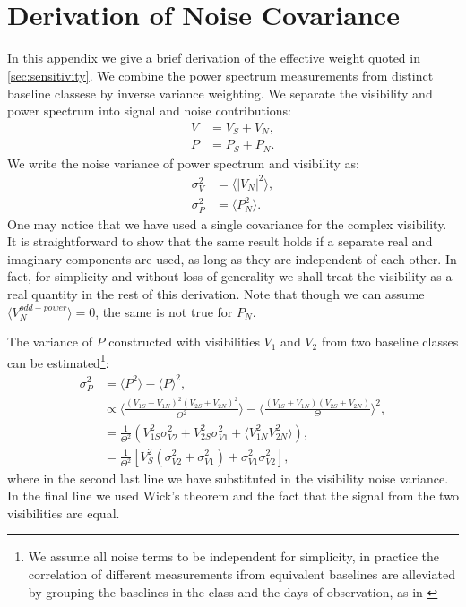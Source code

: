 \documentclass[twocolumn,apj,numberedappendix]{emulateapj}
\renewcommand\[{\begin{equation}}
\renewcommand\]{\end{equation}}
\begin{document}
\section{\label{sec:appB}\\Derivation of Noise Covariance \label{sec:appB}}
\label{sec:appB}
In this appendix we give a brief derivation of the effective weight quoted in \ref{sec:sensitivity}. We combine the power spectrum measurements from distinct baseline classese by inverse variance weighting. We separate the visibility and power spectrum into signal and noise contributions:
\begin{equation}
\begin{aligned}
V &= V_S+V_N,\\
P &= P_S+P_N.
\end{aligned}
\end{equation}
We write the noise variance of power spectrum and visibility as:
\begin{equation}
\begin{aligned}
\sigma_V^2 &= \langle |V_N|^2 \rangle,\\
\sigma_P^2 &= \langle P_N^2 \rangle.
\end{aligned}
\end{equation}
One may notice that we have used a single covariance for the complex visibility. It is straightforward to show that the same result holds if a separate real and imaginary components are used, as long as they are independent of each other. In fact, for simplicity and without loss of generality we shall treat the visibility as a real quantity in the rest of this derivation. 
Note that though we can assume $\langle V_N^{odd-power}\rangle=0$, the same is not true for $P_N$. 

The variance of $P$ constructed with visibilities $V_1$ and $V_2$ from two baseline classes can be estimated\footnote{We assume all noise terms to be independent for simplicity, in practice the correlation of different measurements ifrom equivalent baselines are alleviated by grouping the baselines in the class and the days of observation, as in \cite{Ali2015}}:
\begin{equation}
\begin{aligned}
\sigma_P^2 &= \langle P^2\rangle -\langle P \rangle^2,\\
&\propto \langle \frac{(V_{1S}+V_{1N})^2 (V_{2S}+V_{2N})^2}{\Theta^2} \rangle - \langle \frac{(V_{1S}+V_{1N}) (V_{2S}+V_{2N})}{\Theta} \rangle ^2,\\
&= \frac{1}{\Theta^2} \left( V_{1S}^2\sigma_{V2}^2+V_{2S}^2\sigma_{V1}^2+\langle V_{1N}^2 V_{2N}^2\rangle\right), \\
&= \frac{1}{\Theta^2} \left[ V_{S}^2(\sigma_{V2}^2+\sigma_{V1}^2) + \sigma_{V1}^2 \sigma_{V2}^2\right], 
\end{aligned}
\end{equation}
where in the second last line we have substituted in the visibility noise variance. In the final line we used Wick's theorem and the fact that the signal from the two visibilities are equal. 
\end{document}
